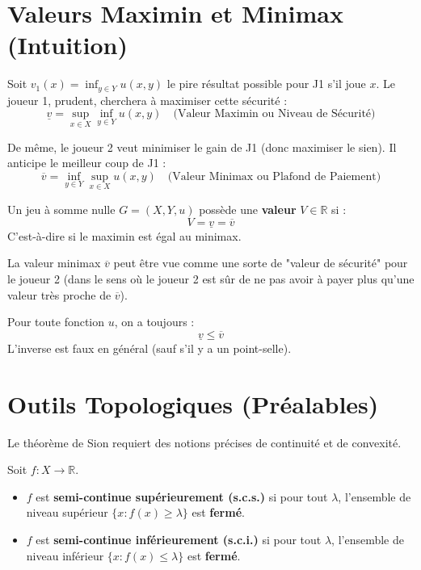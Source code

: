 \section{Valeurs Maximin et Minimax (Intuition)}

Soit $v_1(x) = \inf_{y \in Y} u(x, y)$ le pire résultat possible pour J1 s'il joue $x$.
Le joueur 1, prudent, cherchera à maximiser cette sécurité :
$$\underline{v} = \sup_{x \in X} \inf_{y \in Y} u(x, y) \quad \text{(Valeur Maximin ou Niveau de Sécurité)}$$

De même, le joueur 2 veut minimiser le gain de J1 (donc maximiser le sien). Il anticipe le meilleur coup de J1 :
$$\overline{v} = \inf_{y \in Y} \sup_{x \in X} u(x, y) \quad \text{(Valeur Minimax ou Plafond de Paiement)}$$

\begin{definition}
Un jeu à somme nulle $G=(X, Y, u)$ possède une \textbf{valeur} $V \in \mathbb{R}$ si :
$$ V = \underline{v} = \overline{v} $$
C'est-à-dire si le maximin est égal au minimax.
\end{definition}

\begin{remarque}
La valeur minimax $\overline{v}$ peut être vue comme une sorte de "valeur de sécurité" pour le joueur 2 (dans le sens où le joueur 2 est sûr de ne pas avoir à payer plus qu'une valeur très proche de $\overline{v}$).
\end{remarque}

\begin{proposition}
Pour toute fonction $u$, on a toujours :
$$\underline{v} \le \overline{v}$$
L'inverse est faux en général (sauf s'il y a un point-selle).
\end{proposition}

\section{Outils Topologiques (Préalables)}
Le théorème de Sion requiert des notions précises de continuité et de convexité.

\begin{definition}
Soit $f: X \to \mathbb{R}$.
\begin{itemize}
    \item $f$ est \textbf{semi-continue supérieurement (s.c.s.)} si pour tout $\lambda$, l'ensemble de niveau supérieur $\{x : f(x) \ge \lambda\}$ est \textbf{fermé}.
    \item $f$ est \textbf{semi-continue inférieurement (s.c.i.)} si pour tout $\lambda$, l'ensemble de niveau inférieur $\{x : f(x) \le \lambda\}$ est \textbf{fermé}.
\end{itemize}
\end{definition}

